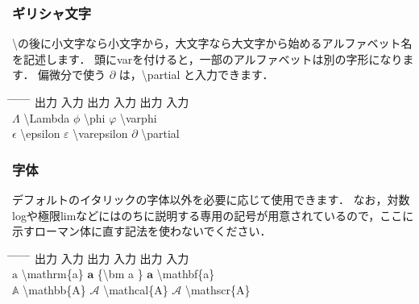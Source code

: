 \documentclass[11pt,a4j,onecolumn]{jsreport} %
\begin{document}
\subsubsection{ギリシャ文字}

\textbackslash の後に小文字なら小文字から，大文字なら大文字から始めるアルファベット名を記述します．
頭にvarを付けると，一部のアルファベットは別の字形になります．
偏微分で使う $\partial$ は，\textbackslash partial と入力できます．

\begin{tabbing}
  \hspace{20truemm} \= \hspace{10truemm} \= \hspace{30truemm} \= \hspace{10truemm} \= \hspace{30truemm} \= \hspace{10truemm} \= \hspace{20truemm} \kill
  \> 出力 \> 入力 \> 出力 \> 入力 \> 出力 \> 入力 \\
  \> $\Lambda$ \> \textbackslash Lambda \> $\phi$ \>\textbackslash phi \> $\varphi$ \> \textbackslash varphi \\
  \> $\epsilon$ \> \textbackslash epsilon \> $\varepsilon$ \>\textbackslash varepsilon \> $\partial$ \> \textbackslash partial \\
\end{tabbing}

\subsubsection{字体}

デフォルトのイタリックの字体以外を必要に応じて使用できます．
なお，対数logや極限limなどにはのちに説明する専用の記号が用意されているので，ここに示すローマン体に直す記法を使わないでください．

\begin{tabbing}
  \hspace{20truemm} \= \hspace{10truemm} \= \hspace{30truemm} \= \hspace{10truemm} \= \hspace{30truemm} \= \hspace{10truemm} \= \hspace{20truemm} \kill
  \> 出力 \> 入力 \> 出力 \> 入力 \> 出力 \> 入力 \\
  \> $\mathrm{a}$ \> \textbackslash mathrm\{a\} \> ${\bm a}$ \> \{\textbackslash bm a \} \> $\mathbf{a}$ \> \textbackslash mathbf\{a\} \\
  \> $\mathbb{A}$ \> \textbackslash mathbb\{A\} \> $\mathcal{A}$ \> \textbackslash mathcal\{A\} \> $\mathscr{A}$ \> \textbackslash mathscr\{A\} \\
\end{tabbing}
\end{document}
